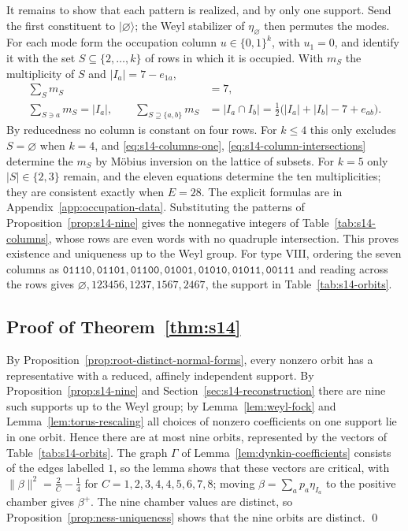 \documentclass{article}
\theoremstyle{definition}
\theoremstyle{remark}
\newcommand{\ket}[1]{\lvert #1\rangle}
\newcommand{\norm}[1]{\lVert #1\rVert}
\begin{document}
It remains to show that each pattern is realized, and by only one support.
Send the first constituent to $\ket\varnothing$; the Weyl stabilizer of
$\eta_\varnothing$ then permutes the modes. For each mode form the occupation
column $u\in\{0,1\}^k$, with $u_1=0$, and identify it with the set
$S\subseteq\{2,\ldots,k\}$ of rows in which it is occupied. With $m_S$ the
multiplicity of $S$ and $\lvert I_a\rvert=7-e_{1a}$,
\begin{align}
 \sum_Sm_S&=7,\label{eq:s14-columns-one}\\
 \sum_{S\ni a}m_S=\lvert I_a\rvert,\qquad
 \sum_{S\supseteq\{a,b\}}m_S&=\lvert I_a\cap I_b\rvert
 =\tfrac12\bigl(\lvert I_a\rvert+\lvert I_b\rvert-7+e_{ab}\bigr).
 \label{eq:s14-column-intersections}
\end{align}
By reducedness no column is constant on four rows. For $k\le4$ this only
excludes $S=\varnothing$ when $k=4$, and \eqref{eq:s14-columns-one},
\eqref{eq:s14-column-intersections} determine the $m_S$ by M\"obius inversion
on the lattice of subsets. For $k=5$ only $\lvert S\rvert\in\{2,3\}$ remain,
and the eleven equations determine the ten multiplicities; they are
consistent exactly when $E=28$. The explicit formulas are in
Appendix~\ref{app:occupation-data}. Substituting the patterns of
Proposition~\ref{prop:s14-nine} gives the nonnegative integers of
Table~\ref{tab:s14-columns}, whose rows are even words with no quadruple
intersection. This proves existence and uniqueness up to the Weyl group. For
type VIII, ordering the seven columns as
$\mathtt{01110},\mathtt{01101},\mathtt{01100},\mathtt{01001},\mathtt{01010},
\mathtt{01011},\mathtt{00111}$ and reading across the rows gives
$\varnothing,123456,1237,1567,2467$, the support in
Table~\ref{tab:s14-orbits}.

\subsection{Proof of Theorem~\ref{thm:s14}}

By Proposition~\ref{prop:root-distinct-normal-forms}, every nonzero orbit has
a representative with a reduced, affinely independent support. By
Proposition~\ref{prop:s14-nine} and Section~\ref{sec:s14-reconstruction}
there are nine such supports up to the Weyl group; by
Lemma~\ref{lem:weyl-fock} and Lemma~\ref{lem:torus-rescaling} all choices of
nonzero coefficients on one support lie in one orbit. Hence there are at most
nine orbits, represented by the vectors of Table~\ref{tab:s14-orbits}. The
graph $\Gamma$ of Lemma~\ref{lem:dynkin-coefficients} consists of the edges
labelled $1$, so the lemma shows that these vectors are critical, with
$\norm\beta^2=\frac2C-\frac14$ for $C=1,2,3,4,4,5,6,7,8$; moving
$\beta=\sum_ap_a\eta_{I_a}$ to the positive chamber gives $\beta^+$. The nine
chamber values are distinct, so Proposition~\ref{prop:ness-uniqueness} shows
that the nine orbits are distinct. \qed
\end{document}

